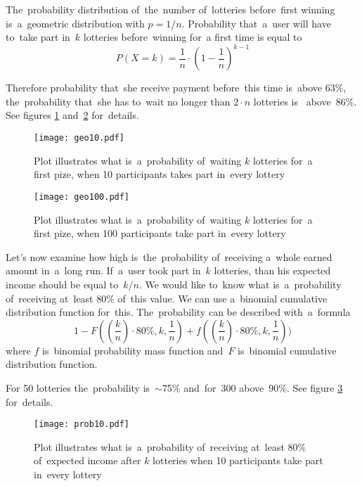 \documentclass[a4paper]{article}
\begin{document}
    The~probability distribution of~the~number of~lotteries before~first winning is~a~geometric distribution with
    $p = 1/n$. Probability that~a~user will have to~take part in~$k$ lotteries before~winning for~a first time is
    equal to
    \begin{displaymath}
	    P(X = k) = \frac{1}{n} \cdot (1 - \frac{1}{n})^{k-1}
	\end{displaymath}

    Therefore probability that~she receive payment before~this time is~above 63\%, the~probability that~she has to~wait
    no longer than $2 \cdot n$ lotteries  is~ above~$86\%$. See figures \ref{fig:geo} and~\ref{fig:geo100} for~details.

    \begin{figure}
        \centering
        \texttt{[image: geo10.pdf]}
        \caption{Plot illustrates what is~a~probability of~waiting $k$ lotteries for~a first pize, when 10 participants
        takes part in~every lottery}
        \label{fig:geo}
    \end{figure}

    \begin{figure}
        \centering
        \texttt{[image: geo100.pdf]}
        \caption{Plot illustrates what is~a~probability of~waiting $k$ lotteries for~a first pize, when
        100 participants take part in~every lottery}
        \label{fig:geo100}
    \end{figure}

    Let's now examine how high is~the~probability of~receiving a~whole earned amount in~a~long run. If~a~user took part
    in~$k$ lotteries, than his expected income should be equal to~$k/n$. We would like to~know what is~a~probability
    of~receiving at~least  80\% of~this value. We can use a~binomial cumulative distribution function for~this.
    The~probability can be described with~a~formula
    \begin{displaymath}
        1 - F((\frac{k}{n})\cdot 80\%, k, \frac{1}{n}) + f((\frac{k}{n})\cdot 80\%, k, \frac{1}{n}))
    \end{displaymath}
    where $f$ is~binomial probability mass function and~$F$ is~binomial cumulative distribution function.

    For 50 lotteries the~probability is~$\sim$75\%  and~for~300 above~$90\%$. See figure \ref{fig:prob} for~details.


    \begin{figure}
        \centering
        \texttt{[image: prob10.pdf]}
        \caption{Plot illustrates what is~a~probability of~receiving at~least 80\% of~expected income after $k$
        lotteries when 10 participants take part in~every lottery}
        \label{fig:prob}
    \end{figure}
\end{document}
